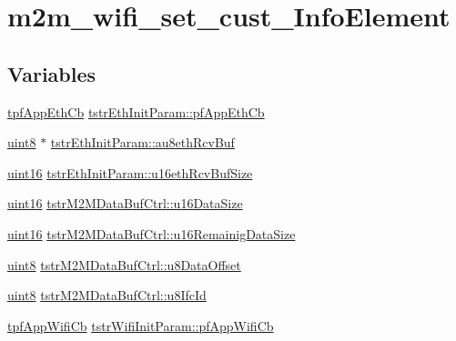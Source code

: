 \hypertarget{group__WifiSetCustInfoElementFn}{}\section{m2m\+\_\+wifi\+\_\+set\+\_\+cust\+\_\+\+Info\+Element}
\label{group__WifiSetCustInfoElementFn}
\subsection*{Variables}
\begin{DoxyCompactItemize}
\item 
\hyperlink{group__WlanEnums_ga9dda38bbac67906396ad1b1e0419502d}{tpf\+App\+Eth\+Cb} \hyperlink{group__WifiSetCustInfoElementFn_gaf4ff856212372005fe5b3ef30c6e8d7d}{tstr\+Eth\+Init\+Param\+::pf\+App\+Eth\+Cb}
\item 
\hyperlink{group__DataT_ga4df709a77647e870bbf1d955b8edc9a6}{uint8} $\ast$ \hyperlink{group__WifiSetCustInfoElementFn_gaa0328252052cf33e1ca7c695e238a067}{tstr\+Eth\+Init\+Param\+::au8eth\+Rcv\+Buf}
\item 
\hyperlink{group__DataT_ga1daa745171fc6e31d942c161422a76f9}{uint16} \hyperlink{group__WifiSetCustInfoElementFn_ga536ae78324c98515266f493c81da12ab}{tstr\+Eth\+Init\+Param\+::u16eth\+Rcv\+Buf\+Size}
\item 
\hyperlink{group__DataT_ga1daa745171fc6e31d942c161422a76f9}{uint16} \hyperlink{group__WifiSetCustInfoElementFn_ga3f7624c769ee776c165695e62ddc0eff}{tstr\+M2\+M\+Data\+Buf\+Ctrl\+::u16\+Data\+Size}
\item 
\hyperlink{group__DataT_ga1daa745171fc6e31d942c161422a76f9}{uint16} \hyperlink{group__WifiSetCustInfoElementFn_ga680ef685d03bc2cf57820c5721eefbd8}{tstr\+M2\+M\+Data\+Buf\+Ctrl\+::u16\+Remainig\+Data\+Size}
\item 
\hyperlink{group__DataT_ga4df709a77647e870bbf1d955b8edc9a6}{uint8} \hyperlink{group__WifiSetCustInfoElementFn_ga64696606fffd6f5dc92e09f4906a820b}{tstr\+M2\+M\+Data\+Buf\+Ctrl\+::u8\+Data\+Offset}
\item 
\hyperlink{group__DataT_ga4df709a77647e870bbf1d955b8edc9a6}{uint8} \hyperlink{group__WifiSetCustInfoElementFn_ga241fb3cd2305fec01b46ef9f19180806}{tstr\+M2\+M\+Data\+Buf\+Ctrl\+::u8\+Ifc\+Id}
\item 
\hyperlink{group__WlanEnums_gac5302f32839285fe8375c159087aa8a1}{tpf\+App\+Wifi\+Cb} \hyperlink{group__WifiSetCustInfoElementFn_ga13d5fa7a0c71fd59bbf36a61923835cc}{tstr\+Wifi\+Init\+Param\+::pf\+App\+Wifi\+Cb}

\end{DoxyCompactItemize}
